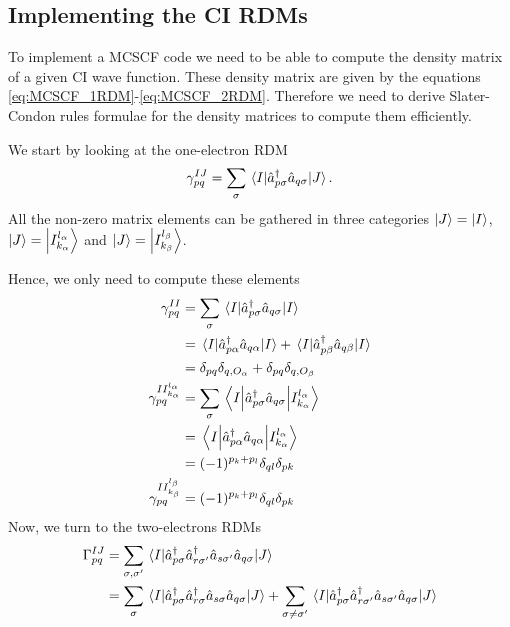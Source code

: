 \documentclass[11pt,a4paper]{article}
\newcommand{\oa}{O_{\alpha}}
\newcommand{\ob}{O_{\beta}}
\begin{document}
\subsection{Implementing the CI RDMs}

To implement a MCSCF code we need to be able to compute the density matrix of a given CI wave function. These density matrix are given by the equations \eqref{eq:MCSCF_1RDM}-\eqref{eq:MCSCF_2RDM}.
Therefore we need to derive Slater-Condon rules formulae for the density matrices to compute them efficiently.

We start by looking at the one-electron RDM
\begin{equation}
  \label{eq:1RDM}
  \gamma_{pq}^{IJ}=\sum_\sigma\mel{I}{\hat{a}_{p\sigma}^\dagger \hat{a}_{q\sigma}}{J}.
\end{equation}
All the non-zero matrix elements can be gathered in three categories $\ket{J}=\ket{I}$, $\ket{J}=\ket{I_{k_\alpha}^{l_\alpha}}$ and $\ket{J}=\ket{I_{k_\beta}^{l_\beta}}$.

Hence, we only need to compute these elements
\begin{subequations}
  \label{eq:1RDM_nonzero}
  \begin{align}
    \gamma_{pq}^{II} &= \sum_\sigma\mel{I}{\hat{a}_{p\sigma}^\dagger \hat{a}_{q\sigma}}{I} \\
                     &= \mel{I}{\hat{a}_{p\alpha}^\dagger \hat{a}_{q\alpha}}{I} + \mel{I}{\hat{a}_{p\beta}^\dagger \hat{a}_{q\beta}}{I} \notag\\
                     &= \delta_{pq} \delta_{q,\oa} + \delta_{pq} \delta_{q,\ob} \notag \\
    \gamma_{pq}^{II_{k_\alpha}^{l_\alpha}} &= \sum_\sigma\mel{I}{\hat{a}_{p\sigma}^\dagger \hat{a}_{q\sigma}}{I_{k_\alpha}^{l_\alpha}} \\
                     &= \mel{I}{\hat{a}_{p\alpha}^\dagger \hat{a}_{q\alpha}}{I_{k_\alpha}^{l_\alpha}} \notag\\
                     &= (-1)^{p_k+p_l} \delta_{ql}\delta_{pk} \notag \\
    \gamma_{pq}^{II_{k_\beta}^{l_\beta}} &= (-1)^{p_k+p_l} \delta_{ql}\delta_{pk}
  \end{align} 
\end{subequations}
Now, we turn to the two-electrons RDMs
\begin{align}
  \label{eq:2RDM}
  \Gamma_{pq}^{IJ}&=\sum_{\sigma,\sigma'}\mel{I}{\hat{a}_{p\sigma}^\dagger\hat{a}_{r\sigma'}^\dagger\hat{a}_{s\sigma'}\hat{a}_{q\sigma}}{J} \\
  &= \sum_{\sigma}\mel{I}{\hat{a}_{p\sigma}^\dagger\hat{a}_{r\sigma}^\dagger\hat{a}_{s\sigma}\hat{a}_{q\sigma}}{J} + \sum_{\sigma \neq \sigma'}\mel{I}{\hat{a}_{p\sigma}^\dagger\hat{a}_{r\sigma'}^\dagger\hat{a}_{s\sigma'}\hat{a}_{q\sigma}}{J} \notag
\end{align}
\end{document}
